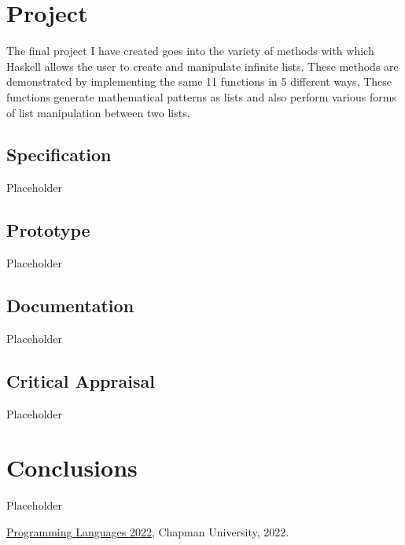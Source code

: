 \documentclass{article}
\theoremstyle{theorem}
\theoremstyle{definition}
\theoremstyle{remark}
\begin{document}
\section{Project}

The final project I have created goes into the variety of methods with which Haskell allows the user to create and manipulate infinite lists. These methods are demonstrated by implementing the same 11 functions in 5 different ways. These functions generate mathematical patterns as lists and also perform various forms of list manipulation between two lists.

\subsection{Specification}
Placeholder

\subsection{Prototype}

Placeholder

\subsection{Documentation}

Placeholder

\subsection{Critical Appraisal}

Placeholder

\section{Conclusions}\label{conclusions}

Placeholder

\begin{thebibliography}{99}
 \href{https://github.com/alexhkurz/programming-languages-2022/blob/main/README.md}{Programming Languages 2022}, Chapman University, 2022.
\end{thebibliography}
\end{document}
